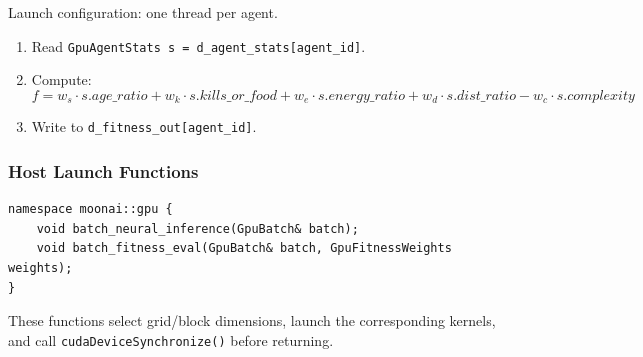 Launch configuration: one thread per agent.

\begin{enumerate}[nosep]
  \item Read \texttt{GpuAgentStats s = d\_agent\_stats[agent\_id]}.
  \item Compute:
    \[
      f = w_s \cdot s.\mathit{age\_ratio}
        + w_k \cdot s.\mathit{kills\_or\_food}
        + w_e \cdot s.\mathit{energy\_ratio}
        + w_d \cdot s.\mathit{dist\_ratio}
        - w_c \cdot s.\mathit{complexity}
    \]
  \item Write to \texttt{d\_fitness\_out[agent\_id]}.
\end{enumerate}

\subsubsection{Host Launch Functions}

\begin{lstlisting}
namespace moonai::gpu {
    void batch_neural_inference(GpuBatch& batch);
    void batch_fitness_eval(GpuBatch& batch, GpuFitnessWeights weights);
}
\end{lstlisting}

These functions select grid/block dimensions, launch the corresponding kernels, and call
\texttt{cudaDeviceSynchronize()} before returning.

